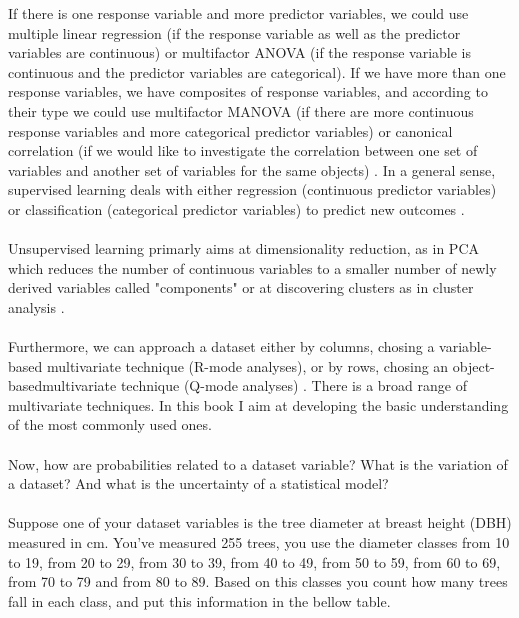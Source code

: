 \documentclass {article}
\begin{document}
 If there is one response variable and more predictor variables, we could use multiple linear regression (if the response variable as well as the predictor variables are continuous) or multifactor ANOVA (if the response variable is continuous and the predictor variables are categorical).
 If we have more than one response variables, we have composites of response variables, and according to their type we could use multifactor MANOVA (if there are more continuous response variables and more categorical predictor variables) or canonical correlation (if we would like to investigate the correlation between one set of variables and another set of variables for the same objects) \cite{quinn_experimental_2002} \cite{murphy_machine_2012}. In a general sense, supervised learning deals with either regression (continuous predictor variables) or classification (categorical predictor variables) to predict new outcomes \cite{murphy_machine_2012}.   
\\
\\
Unsupervised learning primarly aims at dimensionality reduction, as in PCA which reduces the number of continuous variables to a smaller number of newly derived variables called "components" or at discovering clusters as in cluster analysis\cite{carroll_mathematical_1997} \cite{quinn_experimental_2002} \cite{murphy_machine_2012}. 
\\
\\ 
Furthermore, we can approach a dataset either by columns, chosing a variable-based multivariate technique (R-mode analyses), or by rows, chosing an object-basedmultivariate technique (Q-mode analyses) \cite{quinn_experimental_2002}.    
There is a broad range of multivariate techniques. In this book I aim at developing the basic understanding of the most commonly used ones. 
\\
\\
Now, how are probabilities related to a dataset variable? What is the variation of a dataset? And what is the uncertainty of a statistical model?
\\
\\
Suppose one of your dataset variables is the tree diameter at breast height (DBH) measured in cm. You've measured 255 trees, you use the diameter classes from 10 to 19, from 20 to 29, from 30 to 39, from 40 to 49, from 50 to 59, from 60 to 69, from 70 to 79 and from 80 to 89. Based on this classes you count how many trees fall in each class, and put this information in the bellow table.
\end{document}
